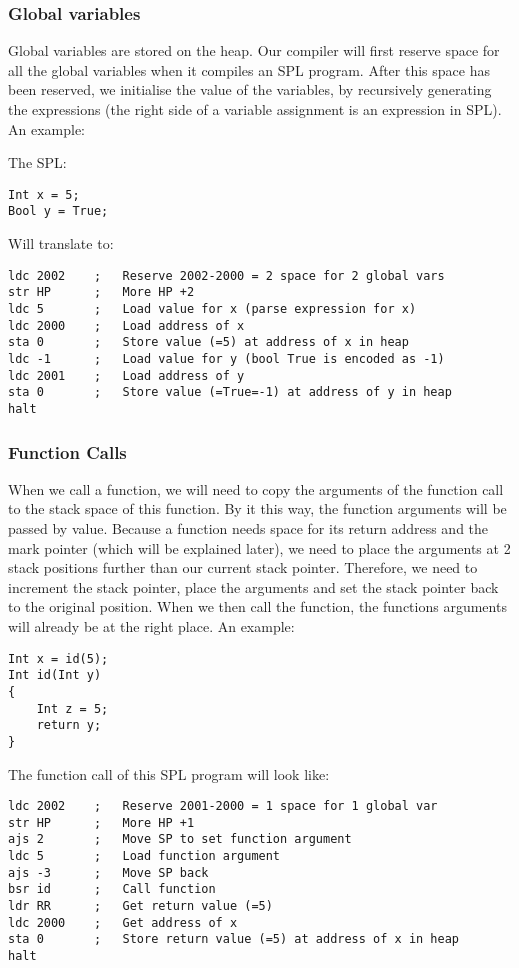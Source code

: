 \documentclass[a4paper]{article}
\begin{document}
\subsubsection{Global variables}
Global variables are stored on the heap. Our compiler will first reserve space for all the global variables when it compiles an SPL program. After this space has been reserved, we initialise the value of the variables, by recursively generating the expressions (the right side of a variable assignment is an expression in SPL). An example:

The SPL:
\begin{lstlisting}
Int x = 5;
Bool y = True;
\end{lstlisting}
Will translate to:
\begin{lstlisting}
ldc 2002	;	Reserve 2002-2000 = 2 space for 2 global vars
str HP		;	More HP +2	
ldc 5		; 	Load value for x (parse expression for x)
ldc 2000	;	Load address of x
sta 0		;	Store value (=5) at address of x in heap
ldc -1		;	Load value for y (bool True is encoded as -1)
ldc 2001	;	Load address of y
sta 0		;	Store value (=True=-1) at address of y in heap
halt		
\end{lstlisting}

\subsubsection{Function Calls}
When we call a function, we will need to copy the arguments of the function call to the stack space of this function. By it this way, the function arguments will be passed by value. Because a function needs space for its return address and the mark pointer (which will be explained later), we need to place the arguments at 2 stack positions further than our current stack pointer. Therefore, we need to increment the stack pointer, place the arguments and set the stack pointer back to the original position. When we then call the function, the functions arguments will already be at the right place. An example:

\begin{lstlisting}
Int x = id(5);
Int id(Int y)
{
	Int z = 5;
	return y;
}
\end{lstlisting}
The function call of this SPL program will look like:
\begin{lstlisting}
ldc 2002	;	Reserve 2001-2000 = 1 space for 1 global var
str HP		;	More HP +1
ajs 2		;	Move SP to set function argument
ldc 5		;	Load function argument
ajs -3		;	Move SP back
bsr id		;	Call function
ldr RR		;	Get return value (=5)
ldc 2000	;	Get address of x
sta 0		;	Store return value (=5) at address of x in heap
halt
\end{lstlisting}
\end{document}
